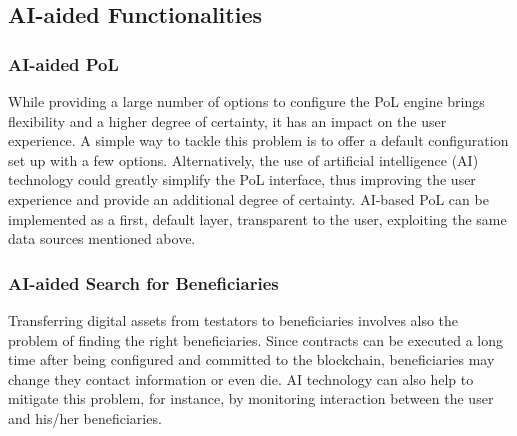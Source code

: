 \subsection{AI-aided Functionalities} %
\label{sub:ai_aided_functionalities}


\subsubsection{AI-aided PoL} %
\label{ssub:ai_based_pol}

While providing a large number of options to configure the PoL engine brings flexibility and a higher degree of certainty, it has an impact on the user experience. A simple way to tackle this problem is to offer a default configuration set up with a few options. Alternatively, the use of artificial intelligence (AI) technology could greatly simplify the PoL interface, thus improving the user experience and provide an additional degree of certainty. AI-based PoL can be implemented as a first, default layer, transparent to the user, exploiting the same data sources mentioned above.


\subsubsection{AI-aided Search for Beneficiaries} %
\label{ssub:ai_aided_search_for_beneficiaries}
Transferring digital assets from testators to beneficiaries involves also the problem of finding the right beneficiaries. Since contracts can be executed a long time after being configured and committed to the blockchain, beneficiaries may change they contact information or even die. 
AI technology can also help to mitigate this problem, for instance, by monitoring interaction between the user and his/her beneficiaries.




